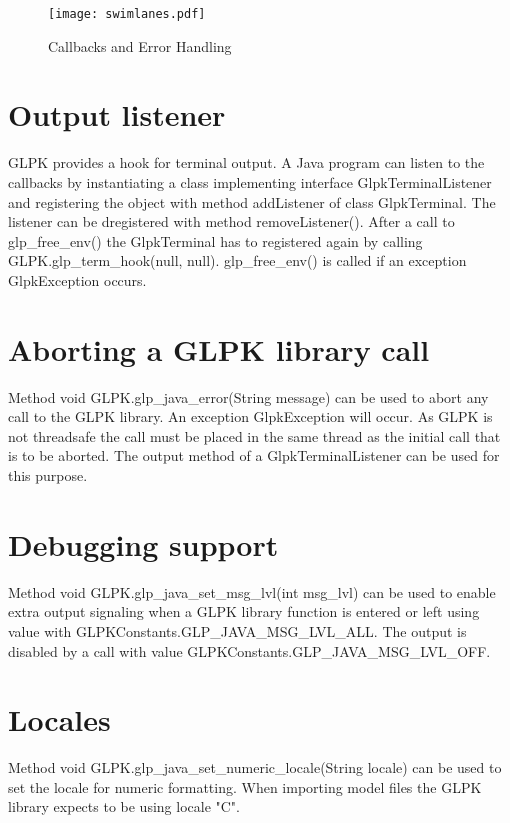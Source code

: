 \documentclass[a4paper,11pt]{report}
\begin{document}
\begin{landscape}
\begin{figure}[swimlanes]
\caption{Callbacks and Error Handling}
\texttt{[image: swimlanes.pdf]}
\end{figure}
\end{landscape}

\section{Output listener}
GLPK provides a hook for terminal output. A Java program can listen to the
callbacks by instantiating a class implementing interface GlpkTerminalListener
and registering the object with method addListener of class GlpkTerminal.
The listener can be dregistered with method removeListener().
After a call to glp\_free\_env() the GlpkTerminal has to registered again
by calling GLPK.glp\_term\_hook(null, null). glp\_free\_env() is called if
an exception GlpkException occurs.

\section{Aborting a GLPK library call}
Method void GLPK.glp\_java\_error(String message) can be used to abort any call
to the GLPK library. An exception GlpkException will occur. As GLPK is not
threadsafe the call must be placed in the same thread as the initial call that
is to be aborted. The output method of a GlpkTerminalListener can be used
for this purpose.

\section{Debugging support}
Method void GLPK.glp\_java\_set\_msg\_lvl(int msg\_lvl) can be used to enable
extra output signaling when a GLPK library function is entered or left using 
value with GLPKConstants.GLP\_JAVA\_MSG\_LVL\_ALL. The output is disabled by a
call with value GLPKConstants.GLP\_JAVA\_MSG\_LVL\_OFF.

\section{Locales}
Method void GLPK.glp\_java\_set\_numeric\_locale(String locale) can be used to
set the locale for numeric formatting. When importing model files the GLPK
library expects to be using locale "C".
\end{document}
